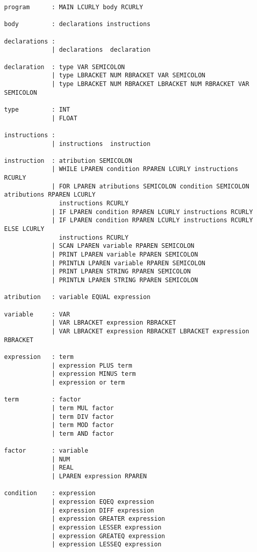 \documentclass[11pt,a4paper]{report}%
\begin{document}
\begin{verbatim}
program      : MAIN LCURLY body RCURLY

body         : declarations instructions

declarations : 
             | declarations  declaration

declaration  : type VAR SEMICOLON
             | type LBRACKET NUM RBRACKET VAR SEMICOLON
             | type LBRACKET NUM RBRACKET LBRACKET NUM RBRACKET VAR SEMICOLON

type         : INT
             | FLOAT

instructions :
             | instructions  instruction

instruction  : atribution SEMICOLON
             | WHILE LPAREN condition RPAREN LCURLY instructions RCURLY
             | FOR LPAREN atributions SEMICOLON condition SEMICOLON atributions RPAREN LCURLY 
               instructions RCURLY
             | IF LPAREN condition RPAREN LCURLY instructions RCURLY
             | IF LPAREN condition RPAREN LCURLY instructions RCURLY ELSE LCURLY 
               instructions RCURLY
             | SCAN LPAREN variable RPAREN SEMICOLON
             | PRINT LPAREN variable RPAREN SEMICOLON
             | PRINTLN LPAREN variable RPAREN SEMICOLON
             | PRINT LPAREN STRING RPAREN SEMICOLON
             | PRINTLN LPAREN STRING RPAREN SEMICOLON

atribution   : variable EQUAL expression 

variable     : VAR
             | VAR LBRACKET expression RBRACKET
             | VAR LBRACKET expression RBRACKET LBRACKET expression RBRACKET

expression   : term
             | expression PLUS term
             | expression MINUS term
             | expression or term
             
term         : factor
             | term MUL factor
             | term DIV factor
             | term MOD factor
             | term AND factor

factor       : variable
             | NUM
             | REAL
             | LPAREN expression RPAREN

condition    : expression
             | expression EQEQ expression
             | expression DIFF expression
             | expression GREATER expression
             | expression LESSER expression
             | expression GREATEQ expression
             | expression LESSEQ expression
\end{verbatim}
\end{document}
